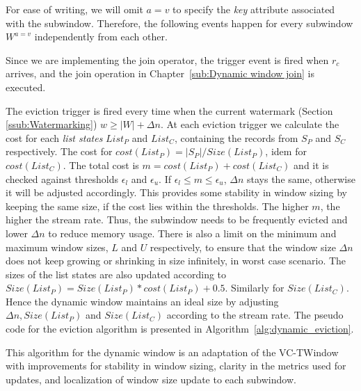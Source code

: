 For ease of writing, we will omit $a=v$ to specify the \emph{key} attribute associated 
with the subwindow. 
Therefore, the following events happen for every subwindow $W^{a=v}$ independently from 
each other. 

Since we are implementing the join operator, the trigger event is fired when  
$r_c$ arrives, and the join operation in Chapter~\ref{sub:Dynamic window join} is 
executed. 


The eviction trigger is fired every time when the current watermark (Section \ref{ssub:Watermarking}) 
$w \ge |W| + \Delta n$. At each eviction trigger we calculate
the cost for each \emph{list states} $List_P$ and $List_C$, containing the records from $S_P$ and $S_C$
respectively. The cost for $cost(List_P) = |S_P|/Size(List_P)$, idem for $cost(List_C)$. 
The total cost is $m = cost(List_P) + cost(List_C)$ and it is checked against thresholds $\epsilon_l$ and $\epsilon_u$. If  $\epsilon_l \le m \le \epsilon_u$, 
$\Delta n$ stays the same, otherwise it will be adjusted accordingly. This provides some stability 
in window sizing by keeping the same size, if the cost lies within the thresholds. 
The higher $m$, the higher the stream rate. Thus, the subwindow needs to be frequently 
evicted and lower $\Delta n$ to reduce memory usage. There is also a limit on the 
minimum and maximum window sizes, $L$ and $U$ respectively, to ensure that the window 
size $\Delta n$ does not keep growing or shrinking in size infinitely, in worst case scenario. 
The sizes of the list states 
are also updated according to $Size(List_P) = Size(List_P) * cost(List_P) + 0.5$.
Similarly for $Size(List_C)$. 
Hence the dynamic window maintains an 
ideal size by adjusting $\Delta n, Size(List_P)$ and $Size(List_C)$ according to 
the stream rate. The pseudo code for the eviction algorithm is presented in Algorithm~\ref{alg:dynamic_eviction}.

This algorithm for the dynamic window is an adaptation of the VC-TWindow~\cite{vctw_join} with 
improvements for stability in window sizing, clarity in the metrics used for updates, and localization 
of window size update to each subwindow.  

